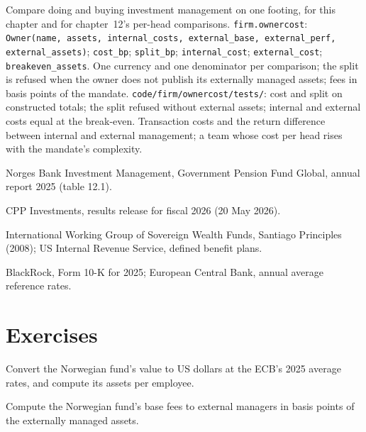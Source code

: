 \begin{build}
 Compare doing and buying investment management on one footing, for this chapter and for chapter~12's
per-head comparisons.
 \texttt{firm.ownercost}: \texttt{Owner(name, assets, internal\_costs, external\_base, external\_perf,
external\_assets)}; \texttt{cost\_bp}; \texttt{split\_bp}; \texttt{internal\_cost}; \texttt{external\_cost};
\texttt{breakeven\_assets}.
 One currency and one denominator per comparison; the split is refused when the owner does not publish its
externally managed assets; fees in basis points of the mandate.
 \texttt{code/firm/ownercost/tests/}: cost and split on constructed totals; the split refused
without external assets; internal and external costs equal at the break-even.
 Transaction costs and the return difference between internal and external management; a team whose
cost per head rises with the mandate's complexity.
\end{build}

\begin{omsources}
\item Norges Bank Investment Management, Government Pension Fund Global, annual report 2025 (table 12.1).
\item CPP Investments, results release for fiscal 2026 (20 May 2026).
\item International Working Group of Sovereign Wealth Funds, Santiago Principles (2008); US Internal Revenue Service,
defined benefit plans.
\item BlackRock, Form 10-K for 2025; European Central Bank, annual average reference rates.
\end{omsources}

\section{Exercises}

\begin{exercise}[$\star$]\label{exo:in:asset-managers-pensions-sovereign-funds-and-insurers:1}
Convert the Norwegian fund's value to US dollars at the ECB's 2025 average rates, and compute its assets per employee.
\end{exercise}

\begin{exercise}[$\star$]\label{exo:in:asset-managers-pensions-sovereign-funds-and-insurers:2}
Compute the Norwegian fund's base fees to external managers in basis points of the externally managed assets.
\end{exercise}

